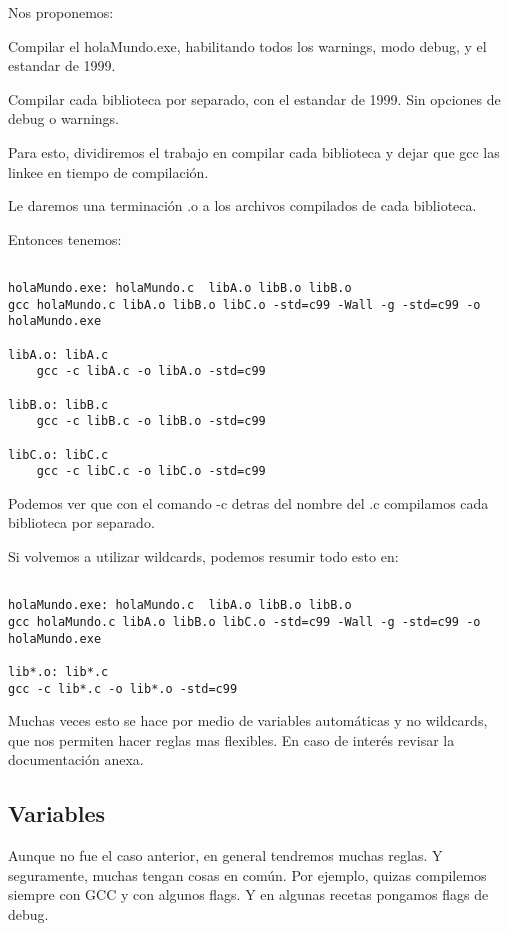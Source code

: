 \documentclass[]{article}
\begin{document}
	Nos proponemos:
		
		Compilar el holaMundo.exe, habilitando todos los warnings, modo debug, y el estandar de 1999.
		
		Compilar cada biblioteca por separado, con el estandar de 1999. Sin opciones de debug o warnings.
		
	Para esto, dividiremos el trabajo en compilar cada biblioteca y dejar que gcc las linkee en tiempo de compilación. 
	
	Le daremos una terminación .o a los archivos compilados de cada biblioteca.
	
	Entonces tenemos:
	
\begin{lstlisting}

holaMundo.exe: holaMundo.c  libA.o libB.o libB.o
gcc holaMundo.c libA.o libB.o libC.o -std=c99 -Wall -g -std=c99 -o holaMundo.exe

libA.o: libA.c
	gcc -c libA.c -o libA.o -std=c99

libB.o: libB.c
	gcc -c libB.c -o libB.o -std=c99
	
libC.o: libC.c
	gcc -c libC.c -o libC.o -std=c99

\end{lstlisting}
	
	Podemos ver que con el comando -c detras del nombre del .c compilamos cada biblioteca por separado. 
	
Si volvemos a utilizar wildcards, podemos resumir todo esto en:

\begin{lstlisting}

holaMundo.exe: holaMundo.c  libA.o libB.o libB.o
gcc holaMundo.c libA.o libB.o libC.o -std=c99 -Wall -g -std=c99 -o holaMundo.exe

lib*.o: lib*.c
gcc -c lib*.c -o lib*.o -std=c99

\end{lstlisting} 

Muchas veces esto se hace por medio de variables automáticas y no wildcards, que nos permiten hacer reglas mas flexibles. En caso de interés revisar la documentación anexa. 

\subsection{Variables}

Aunque no fue el caso anterior, en general tendremos muchas reglas. Y seguramente, muchas tengan cosas en común. Por ejemplo, quizas compilemos siempre con GCC y con algunos flags. Y en algunas recetas pongamos flags de debug. 
\end{document}
